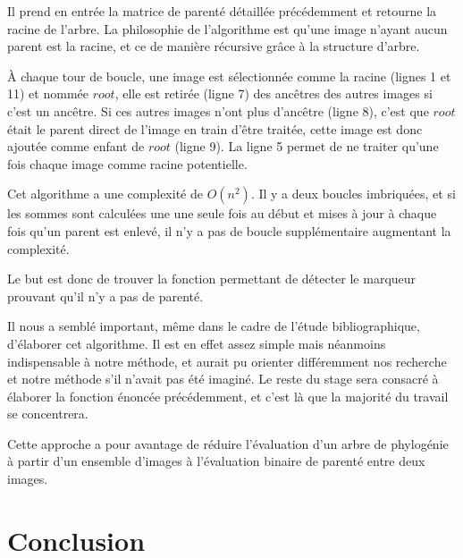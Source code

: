\documentclass[utf8]{stageM2R} %
\begin{document}
Il prend en entrée la matrice de parenté détaillée précédemment et retourne la racine de l'arbre. La philosophie de l'algorithme est qu'une image n'ayant aucun parent est la racine, et ce de manière récursive grâce à la structure d'arbre.



À chaque tour de boucle, une image est sélectionnée comme la racine (lignes 1 et 11) et nommée $root$, elle est retirée (ligne 7) des ancêtres des autres images si c'est un ancêtre. Si ces autres images n'ont plus d'ancêtre (ligne 8), c'est que $root$ était le parent direct de l'image en train d'être traitée, cette image est donc ajoutée comme enfant de $root$ (ligne 9). La ligne 5 permet de ne traiter qu'une fois chaque image comme racine potentielle.

Cet algorithme a une complexité de $O(n^{2})$. Il y a deux boucles imbriquées, et si les sommes sont calculées une une seule fois au début et mises à jour à chaque fois qu'un parent est enlevé, il n'y a pas de boucle supplémentaire augmentant la complexité.

Le but est donc de trouver la fonction permettant de détecter le marqueur prouvant qu'il n'y a pas de parenté. 

Il nous a semblé important, même dans le cadre de l'étude bibliographique, d'élaborer cet algorithme. Il est en effet assez simple mais néanmoins indispensable à notre méthode, et aurait pu orienter différemment nos recherche et notre méthode s'il n'avait pas été imaginé. Le reste du stage sera consacré à élaborer la fonction énoncée précédemment, et c'est là que la majorité du travail se concentrera.

Cette approche a pour avantage de réduire l'évaluation d'un arbre de phylogénie à partir d'un ensemble d'images à l'évaluation binaire de parenté entre deux images.

\chapter{Conclusion}

\printbibliography
\end{document}
